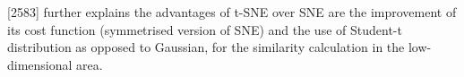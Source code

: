 \textcite{maaten2008visualizing}[2583] further explains the advantages of t-SNE over SNE are the improvement of its cost function (symmetrised version of SNE) and the use of Student-t distribution as opposed to Gaussian, for the similarity calculation in the low-dimensional area.












 

